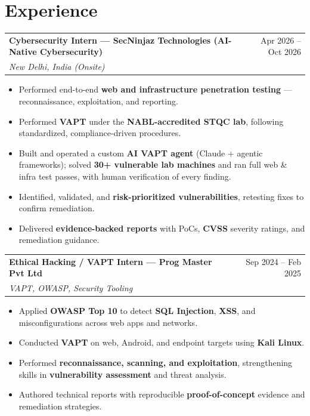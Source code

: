 \documentclass[a4paper,10pt]{article}
\makeatletter
\newcommand{\headrow}[4]{%
  \begin{tabularx}{\textwidth}{@{}X@{\hspace{8pt}}r@{}}
    \textbf{#1} & #2\\[1pt]
    \textit{\color{black!70}#3} & \textit{\color{black!70}#4}\\
  \end{tabularx}%
}
\makeatother
\begin{document}
\section{Experience}
\headrow{Cybersecurity Intern \textnormal{— SecNinjaz Technologies (AI-Native Cybersecurity)}}{Apr 2026 -- Oct 2026}{New Delhi, India (Onsite)}{}
\begin{itemize}
  \item Performed end-to-end \textbf{web and infrastructure penetration testing} — reconnaissance, exploitation, and reporting.
  \item Performed \textbf{VAPT} under the \textbf{NABL-accredited STQC lab}, following standardized, compliance-driven procedures.
  \item Built and operated a custom \textbf{AI VAPT agent} (Claude + agentic frameworks); solved \textbf{30+ vulnerable lab machines} and ran full web \& infra test passes, with human verification of every finding.
  \item Identified, validated, and \textbf{risk-prioritized vulnerabilities}, retesting fixes to confirm remediation.
  \item Delivered \textbf{evidence-backed reports} with PoCs, \textbf{CVSS} severity ratings, and remediation guidance.
\end{itemize}
\vspace{2pt}
\headrow{Ethical Hacking / VAPT Intern \textnormal{— Prog Master Pvt Ltd}}{Sep 2024 -- Feb 2025}{VAPT, OWASP, Security Tooling}{}
\begin{itemize}
  \item Applied \textbf{OWASP Top 10} to detect \textbf{SQL Injection}, \textbf{XSS}, and misconfigurations across web apps and networks.
  \item Conducted \textbf{VAPT} on web, Android, and endpoint targets using \textbf{Kali Linux}.
  \item Performed \textbf{reconnaissance, scanning, and exploitation}, strengthening skills in \textbf{vulnerability assessment} and threat analysis.
  \item Authored technical reports with reproducible \textbf{proof-of-concept} evidence and remediation strategies.
\end{itemize}

\end{document}
